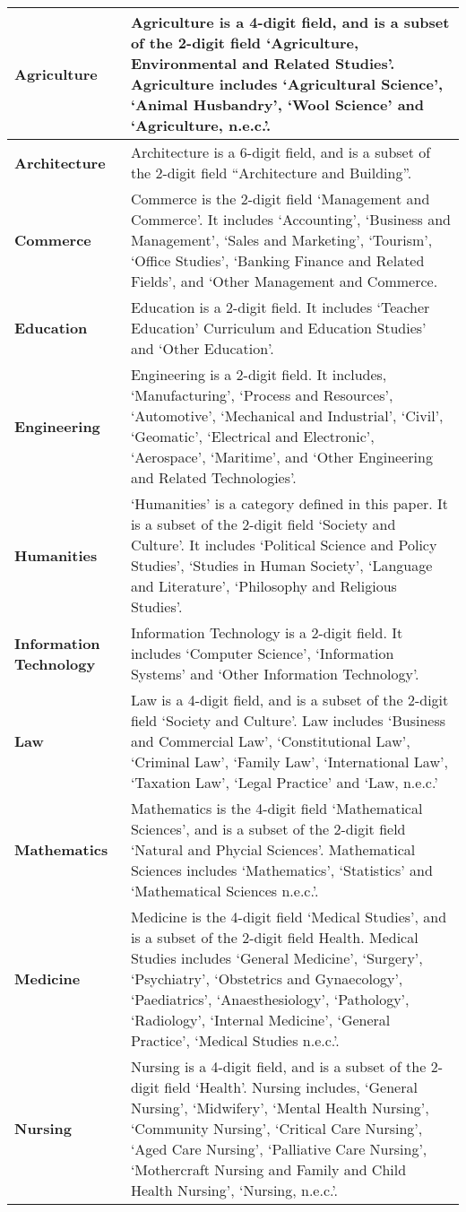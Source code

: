 \documentclass[]{book}
\begin{document}
\begin{longtable}[]{@{}ll@{}}
\toprule
\textbf{Agriculture} & Agriculture is a 4-digit field, and is a subset of the 2-digit field `Agriculture, Environmental and Related Studies'. Agriculture includes `Agricultural Science', `Animal Husbandry', `Wool Science' and `Agriculture, n.e.c.'.\tabularnewline
\midrule
\endhead
\textbf{Architecture} & Architecture is a 6-digit field, and is a subset of the 2-digit field ``Architecture and Building''.\tabularnewline
\textbf{Commerce} & Commerce is the 2-digit field `Management and Commerce'. It includes `Accounting', `Business and Management', `Sales and Marketing', `Tourism', `Office Studies', `Banking Finance and Related Fields', and `Other Management and Commerce.\tabularnewline
\textbf{Education} & Education is a 2-digit field. It includes `Teacher Education' Curriculum and Education Studies' and `Other Education'.\tabularnewline
\textbf{Engineering} & Engineering is a 2-digit field. It includes, `Manufacturing', `Process and Resources', `Automotive', `Mechanical and Industrial', `Civil', `Geomatic', `Electrical and Electronic', `Aerospace', `Maritime', and `Other Engineering and Related Technologies'.\tabularnewline
\textbf{Humanities} & `Humanities' is a category defined in this paper. It is a subset of the 2-digit field `Society and Culture'. It includes `Political Science and Policy Studies', `Studies in Human Society', `Language and Literature', `Philosophy and Religious Studies'.\tabularnewline
\textbf{Information Technology} & Information Technology is a 2-digit field. It includes `Computer Science', `Information Systems' and `Other Information Technology'.\tabularnewline
\textbf{Law} & Law is a 4-digit field, and is a subset of the 2-digit field `Society and Culture'. Law includes `Business and Commercial Law', `Constitutional Law', `Criminal Law', `Family Law', `International Law', `Taxation Law', `Legal Practice' and `Law, n.e.c.'\tabularnewline
\textbf{Mathematics} & Mathematics is the 4-digit field `Mathematical Sciences', and is a subset of the 2-digit field `Natural and Phycial Sciences'. Mathematical Sciences includes `Mathematics', `Statistics' and `Mathematical Sciences n.e.c.'.\tabularnewline
\textbf{Medicine} & Medicine is the 4-digit field `Medical Studies', and is a subset of the 2-digit field Health. Medical Studies includes `General Medicine', `Surgery', `Psychiatry', `Obstetrics and Gynaecology', `Paediatrics', `Anaesthesiology', `Pathology', `Radiology', `Internal Medicine', `General Practice', `Medical Studies n.e.c.'.\tabularnewline
\textbf{Nursing} & Nursing is a 4-digit field, and is a subset of the 2-digit field `Health'. Nursing includes, `General Nursing', `Midwifery', `Mental Health Nursing', `Community Nursing', `Critical Care Nursing', `Aged Care Nursing', `Palliative Care Nursing', `Mothercraft Nursing and Family and Child Health Nursing', `Nursing, n.e.c.'.\tabularnewline

\end{longtable}
\end{document}

